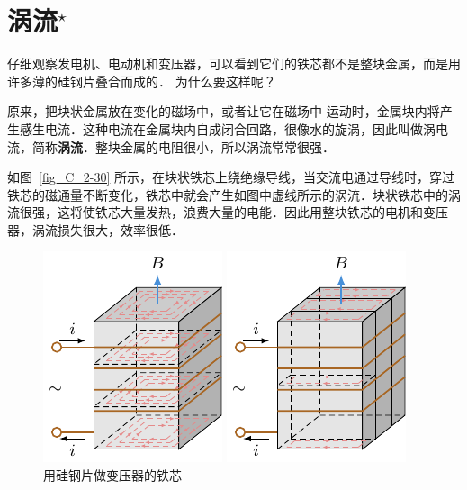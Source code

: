 \section{涡流$^\star$}

仔细观察发电机、电动机和变压器，可以看到它们的铁芯都不是整块金属，而是用许多薄的硅钢片叠合而成的．
为什么要这样呢？

原来，把块状金属放在变化的磁场中，或者让它在磁场中
运动时，金属块内将产生感生电流．这种电流在金属块内自成闭合回路，很像水的旋涡，因此叫做涡电流，简称\textbf{涡流}．整块金属的电阻很小，所以涡流常常很强．

如图~\ref{fig_C_2-30} 所示，在块状铁芯上绕绝缘导线，当交流电通过导线时，穿过铁芯的磁通量不断变化，铁芯中就会产生如图中虚线所示的涡流．块状铁芯中的涡流很强，这将使铁芯大量发热，浪费大量的电能．因此用整块铁芯的电机和变压器，涡流损失很大，效率很低．

\begin{figure}[htbp]
    \centering
    \begin{minipage}[t]{0.4\textwidth}
        \centering
        \includegraphics{fig/C/2-30.pdf}
        \caption{}\label{fig_C_2-30}
    \end{minipage}
    \begin{minipage}[t]{0.5\textwidth}
        \centering
        \includegraphics{fig/C/2-31.pdf}
        \caption{用硅钢片做变压器的铁芯}\label{fig_C_2-31}
    \end{minipage}
\end{figure}


